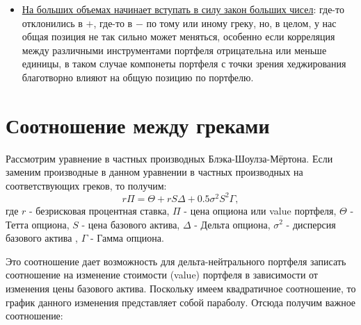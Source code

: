 \documentclass{article}
\begin{document}
\begin{itemize}
\item \underline{На больших объемах начинает вступать в силу закон больших чисел}: где-то отклонились в $+$, где-то в $-$ по тому или иному греку, но, в целом, у нас общая позиция не так сильно может меняться, особенно если корреляция между различными инструментами портфеля отрицательна или меньше единицы, в таком случае компонеты портфеля с точки зрения хеджирования благотворно влияют на общую позицию по портфелю.


  \end{itemize}

\section{Соотношение между греками}

Рассмотрим уравнение в частных производных Блэка-Шоулза-Мёртона. Если заменим производные в данном уравнении в частных производных на соответствующих греков, то получим:
$$r\Pi = \Theta + r S\Delta + 0.5\sigma^2S^2\Gamma,$$
где $r$ - безрисковая процентная ставка,
$\Pi$ - цена опциона или value портфеля, $\Theta$ -  Тетта опциона, $S$ - цена базового актива, $\Delta$ - Дельта опциона, $\sigma^2$ - дисперсия базового актива , $\Gamma$ - Гамма опциона.

Это соотношение дает возможность для дельта-нейтрального портфеля записать соотношение на изменение стоимости (value) портфеля в зависимости от изменения цены базового актива. Поскольку имеем квадратичное соотношение, то график данного изменения представляет собой параболу. Отсюда получим важное соотношение:
 
\end{document}
